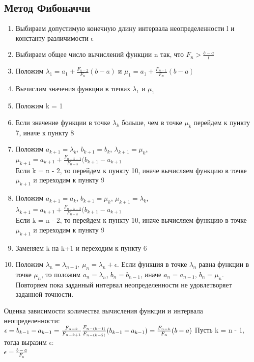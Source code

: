 \documentclass[main.tex]{subfiles}
\begin{document}
	
	
	
	\subsection{Метод Фибоначчи}
	\begin{enumerate}
		\item Выбираем допустимую конечную длину интервала неопределенности l и константу различимости $\epsilon$ 
		\item Выбираем общее число вычислений функции n так, что $F_n >\frac{b-a}{l}$
		\item Положим $\lambda_1 = a_1+\frac{F_{n-2}}{F_n}(b-a)$ и  $\mu_1 = a_1+\frac{F_{n-1}}{F_n}(b-a)$
		\item Вычислим значения функции в точках $\lambda_1$ и $\mu_1$
		\item Положим k = 1
		\item Если значение функции в точке $\lambda_k$ больше, чем в точке $\mu_k$ перейдем к пункту 7, иначе к пункту 8
		\item Положим $a_{k+1} = \lambda_k$, $b_{k+1} = b_k$, $\lambda_{k+1} = \mu_k$, $\mu_{k+1} = a_{k+1}+\frac{F_{n-k-1}}{F_{n-k}}(b_{k+1}-a_{k+1}$\\
		Если k = n - 2, то перейдем к пункту 10, иначе вычисляем функцию в точке $\mu_{k+1}$ и переходим к пункту 9
		\item Положим $a_{k+1} = a_k$, $b_{k+1} = \mu_k$, $\mu_{k+1} = \lambda_k$, $\lambda_{k+1} = a_{k+1}+\frac{F_{n-k-2}}{F_{n-k}}(b_{k+1}-a_{k+1}$\\
		Если k = n - 2, то перейдем к пункту 10, иначе вычисляем функцию в точке $\mu_{k+1}$ и переходим к пункту 9
		\item Заменяем k на k+1 и переходим к пункту 6
		\item Положим $\lambda_{n} = \lambda_{n-1}$, $\mu_{n} = \lambda_n + \epsilon$. Если функция в точке $\lambda_n$ равна функции в точке $\mu_n$, то положим $a_n = \lambda_n$, $b_n=b_{n-1}$, иначе $a_n = a_{n-1}$, $b_n=\mu_n$. Повторяем пока заданный интервал неопределенности не удовлетворяет заданной точности.
	\end{enumerate}
	Оценка зависимости количества вычисления функции и интервала неопределенности:\\
	$\epsilon = b_{k-1}-a_{k-1} = \frac{F_{n-k}}{F_{n-k+1}}\frac{F_{n-(k-1)}}{F_{n-(k-2)}}(b_{k-1}-a_{k-1}) = \frac{F_{n-k}}{F_n} (b-a)\\$
	Пусть k = n - 1, тогда выразим $\epsilon$:\\
	$\epsilon = \frac{b-a}{F_n}$
	
\end{document}
